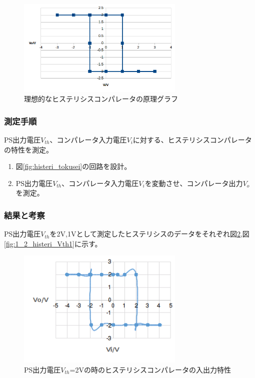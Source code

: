 \documentclass[11pt,a4j]{jsarticle}
\begin{document}
    \begin{figure}[htbp]
  \centering
  \includegraphics[width=8cm,clip]{risou_histeri.png}
  \caption{理想的なヒステリシスコンパレータの原理グラフ}
  \label{fig:risou_histeri}
 \end{figure}
    
   \subsubsection{測定手順}
    PS出力電圧$V_{th}$、コンパレータ入力電圧$V_i$に対する、ヒステリシスコンパレータの特性を測定。
    \begin{enumerate}
    \item 図\ref{fig:histeri_tokusei}の回路を設計。
    \item PS出力電圧$V_{th}$、コンパレータ入力電圧$V_i$を変動させ、コンパレータ出力$V_o$を測定。
    \end{enumerate}
    
   \subsubsection{結果と考察}
    PS出力電圧$V_{th}$を2V,1Vとして測定したヒステリシスのデータをそれぞれ図\ref{fig:1_2_histeri_Vth2},図\ref{fig:1_2_histeri_Vth1}に示す。
    
    \begin{figure}[htbp]
  \centering
  \includegraphics[width=8cm,clip]{1_2_histeri_Vth2.png}
  \caption{PS出力電圧$V_{th}$=2Vの時のヒステリシスコンパレータの入出力特性}
  \label{fig:1_2_histeri_Vth2}
 \end{figure}%
    
\end{document}
